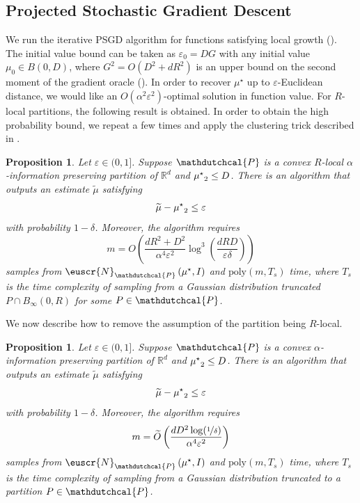 \documentclass[11pt,letterpaper]{article}
\theoremstyle{plain}
\newtheorem{proposition}[theorem]{Proposition}
\theoremstyle{definition}
\theoremstyle{remark}
\newcommand{\inparen}[1]{\ensuremath{\left(#1\right)}}
\let\norm\relax
\newcommand{\norm}[1]{\ensuremath{\left\lVert #1 \right\rVert}}
\newcommand{\R}{\mathbb{R}}
\newcommand{\nfrac}[2]{\nicefrac{#1}{#2}}
\newcommand{\poly}{\mathrm{poly}}
\newcommand{\eps}{\varepsilon}
\renewcommand{\tilde}{\widetilde}
\newcommand{\customcal}[1]{\euscr{#1}}
\newcommand{\cN}{\customcal{N}}
\newcommand{\hypo}[1]{\mathdutchcal{#1}}
\newcommand{\hyP}{\hypo{P}}
\newcommand{\coarseNormal}[3]{\cN_{#3}\inparen{#1,#2}}
\newcommand{\muStar}{{\mu^\star}}
\begin{document}
{{{\subsection{Projected Stochastic Gradient Descent}
We run the iterative PSGD algorithm for functions satisfying local growth ().
The initial value bound can be taken as $\eps_0 = DG$ with any initial value $\mu_0\in B(0, D)$,
where $G^2 = O(D^2 + dR^2)$ is an upper bound on the second moment of the gradient oracle ().
In order to recover $\muStar$ up to $\eps$-Euclidean distance,
we would like an $O(\alpha^2\eps^2)$-optimal solution in function value.
For $R$-local partitions,
the following result is obtained.
In order to obtain the high probability bound,
we repeat  a few times and apply the clustering trick described in .

\begin{proposition}\label{thm:convexLocalPartitionMeanEstimation}
    Let $\eps\in (0, 1]$.
    Suppose $\hyP$ is a convex $R$-local $\alpha$-information preserving partition of $\R^d$ and $\norm{\muStar}_2\leq D$.
    There is an algorithm that outputs an estimate $\tilde \mu$ satisfying
    \[
        \norm{\tilde \mu - \muStar}_2 \leq \eps
    \]
    with probability $1-\delta$. Moreover,
    the algorithm requires
    \[
        m = O\inparen{\frac{dR^2 + D^2}{\alpha^4 \eps^2} \log^3\inparen{\frac{dRD}{\eps \delta}}}
    \]
    samples from $\coarseNormal{\muStar}{I}{\hyP}$ and $\poly(m, T_s)$ time,
    where $T_s$ is the time complexity of sampling from a Gaussian distribution truncated $P\cap B_\infty(0, R)$
    for some $P\in \hyP$.
\end{proposition}

\noindent We now describe how to remove the assumption of the partition being $R$-local.
\begin{proposition}\label{cor:convexPartitionMeanEstimation}
    Let $\eps\in (0, 1]$.
    Suppose $\hyP$ is a convex $\alpha$-information preserving partition of $\R^d$ and $\norm{\muStar}_2\leq D$.
    There is an algorithm that outputs an estimate $\tilde \mu$ satisfying
    \[
        \norm{\tilde \mu - \muStar}_2 \leq \eps
    \]
    with probability $1-\delta$. Moreover,
    the algorithm requires
    \[
        m = \tilde O\inparen{\frac{dD^2 \log(\nfrac1\delta)}{\alpha^4 \eps^2}}
    \]
    samples from $\coarseNormal{\muStar}{I}{\hyP}$ and $\poly(m, T_s)$ time,
    where $T_s$ is the time complexity of sampling from a Gaussian distribution truncated to a partition $P\in \hyP$.
\end{proposition}

}}}
\end{document}
